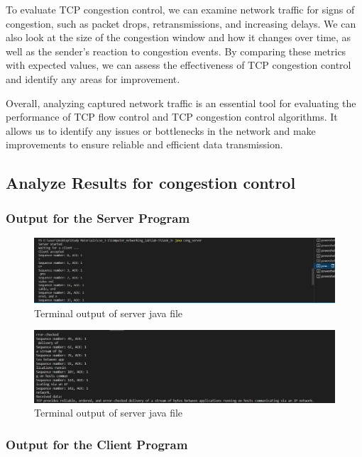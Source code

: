 \documentclass[11pt]{article}
\begin{document}
To evaluate TCP congestion control, we can examine network traffic for signs of congestion, such as packet drops, retransmissions, and increasing delays. We can also look at the size of the congestion window and how it changes over time, as well as the sender's reaction to congestion events. By comparing these metrics with expected values, we can assess the effectiveness of TCP congestion control and identify any areas for improvement.

Overall, analyzing captured network traffic is an essential tool for evaluating the performance of TCP flow control and TCP congestion control algorithms. It allows us to identify any issues or bottlenecks in the network and make improvements to ensure reliable and efficient data transmission.

\subsection{Analyze Results for  congestion control}

\subsubsection{Output for the Server Program}

 \begin{figure}[!h]
\centering
\includegraphics[width=\textwidth]{ac_server1.png}
\caption{Terminal output of server java file }
\end{figure}
\FloatBarrier

\begin{figure}[!h]
\centering
\includegraphics[width=\textwidth]{ac_server2.png}
\caption{Terminal output of server java file }
\end{figure}
\FloatBarrier



\subsubsection{Output for the Client Program}
\end{document}
